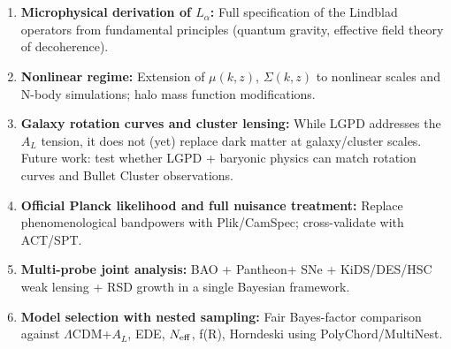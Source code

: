 \documentclass[11pt]{article}
\begin{document}
\begin{enumerate}
  \item \textbf{Microphysical derivation of $\hat{L}_\alpha$:}
  Full specification of the Lindblad operators from fundamental principles (quantum gravity, effective field theory of decoherence).
  
  \item \textbf{Nonlinear regime:}
  Extension of $\mu(k,z)$, $\Sigma(k,z)$ to nonlinear scales and N-body simulations; halo mass function modifications.
  
  \item \textbf{Galaxy rotation curves and cluster lensing:}
  While LGPD addresses the $A_L$ tension, it does not (yet) replace dark matter at galaxy/cluster scales. Future work: test whether LGPD + baryonic physics can match rotation curves and Bullet Cluster observations.
  
  \item \textbf{Official Planck likelihood and full nuisance treatment:}
  Replace phenomenological bandpowers with Plik/CamSpec; cross-validate with ACT/SPT.
  
  \item \textbf{Multi-probe joint analysis:}
  BAO + Pantheon+ SNe + KiDS/DES/HSC weak lensing + RSD growth in a single Bayesian framework.
  
  \item \textbf{Model selection with nested sampling:}
  Fair Bayes-factor comparison against $\Lambda$CDM+$A_L$, EDE, $N_{\rm eff}$, f(R), Horndeski using PolyChord/MultiNest.
\end{enumerate}



\end{document}
